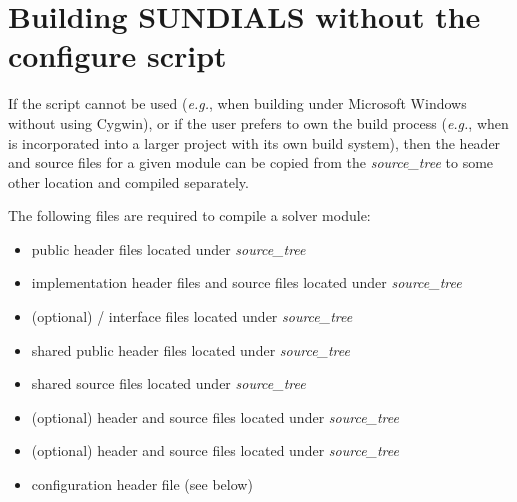 
\section{Building SUNDIALS without the configure script}\label{ss:no_config}

If the  script cannot be used ({\em e.g.}, when building
{\sundials} under Microsoft Windows without using Cygwin), or if the
user prefers to own the build process ({\em e.g.}, when {\sundials} is
incorporated into a larger project with its own build system), then
the header and source files for a given module can be copied from the
{\em source\_tree} to some other location and compiled separately.

The following files are required to compile a {\sundials} solver module:
\begin{itemize}
\item public header files located under 
{\em source\_tree}
\item implementation header files and source files located under
{\em source\_tree}
\item (optional) {\F}/{\C} interface files located under
{\em source\_tree}
\item shared public header files located under
{\em source\_tree}
\item shared source files located under
{\em source\_tree}
\item (optional) {\nvecs} header and source files located under
{\em source\_tree}
\item (optional) {\nvecp} header and source files located under
{\em source\_tree}
\item configuration header file  (see below)
\end{itemize}

